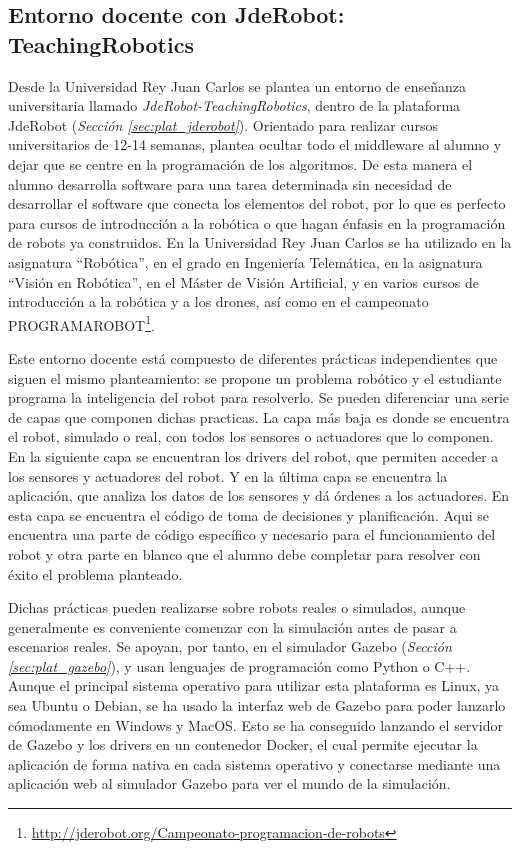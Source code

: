 \subsection{Entorno docente con JdeRobot: TeachingRobotics}
\label{subsec:intr_entornodocente}

Desde la Universidad Rey Juan Carlos se plantea un entorno de enseñanza universitaria llamado \textit{JdeRobot-TeachingRobotics}, dentro de la plataforma JdeRobot (\textit{Sección \ref{sec:plat_jderobot}}). Orientado para realizar cursos universitarios de 12-14 semanas, plantea ocultar todo el middleware al alumno y dejar que se centre en la programación de los algoritmos. De esta manera el alumno desarrolla software para una tarea determinada sin necesidad de desarrollar el software que conecta los elementos del robot, por lo que es perfecto para cursos de introducción a la robótica o que hagan énfasis en la programación de robots ya construidos. En la Universidad Rey Juan Carlos se ha utilizado en la asignatura \textquotedblleft Robótica\textquotedblright, en el grado en Ingeniería Telemática, en la asignatura \textquotedblleft Visión en Robótica\textquotedblright, en el Máster de Visión Artificial, y en varios cursos de introducción a la robótica y a los drones, así como en el campeonato PROGRAMAROBOT\footnote{\url{http://jderobot.org/Campeonato-programacion-de-robots}}.

Este entorno docente está compuesto de diferentes prácticas independientes que siguen el mismo planteamiento: se propone un problema robótico y el estudiante programa la inteligencia del robot para resolverlo. Se pueden diferenciar una serie de capas que componen dichas practicas. La capa más baja es donde se encuentra el robot, simulado o real, con todos los sensores o actuadores que lo componen. En la siguiente capa se encuentran los drivers del robot, que permiten acceder a los sensores y actuadores del robot. Y en la última capa se encuentra la aplicación, que analiza los datos de los sensores y dá órdenes a los actuadores. En esta capa se encuentra el código de toma de decisiones y planificación. Aqui se encuentra una parte de código específico y necesario para el funcionamiento del robot y otra parte en blanco que el alumno debe completar para resolver con éxito el problema planteado. 

Dichas prácticas pueden realizarse sobre robots reales o simulados, aunque generalmente es conveniente comenzar con la simulación antes de pasar a escenarios reales. Se apoyan, por tanto, en el simulador Gazebo (\textit{Sección \ref{sec:plat_gazebo}}), y usan lenguajes de programación como Python o C++. Aunque el principal sistema operativo para utilizar esta plataforma es Linux, ya sea Ubuntu o Debian, se ha usado la interfaz web de Gazebo para poder lanzarlo cómodamente en Windows y MacOS. Esto se ha conseguido lanzando el servidor de Gazebo y los drivers en un contenedor Docker, el cual permite ejecutar la aplicación de forma nativa en cada sistema operativo y conectarse mediante una aplicación web al simulador Gazebo para ver el mundo de la simulación.

